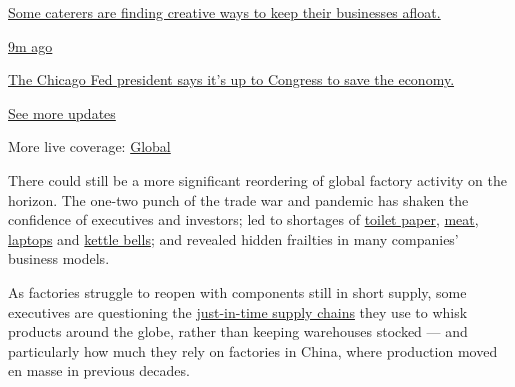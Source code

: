 \href{https://www.nytimes.com/live/2020/08/04/business/stock-market-today-coronavirus?action=click\&pgtype=Article\&state=default\&region=MAIN_CONTENT_1\&context=storylines_live_updates\#some-caterers-are-finding-creative-ways-to-keep-their-businesses-afloat}{Some
caterers are finding creative ways to keep their businesses afloat.}

\href{https://www.nytimes.com/live/2020/08/04/business/stock-market-today-coronavirus?action=click\&pgtype=Article\&state=default\&region=MAIN_CONTENT_1\&context=storylines_live_updates\#the-chicago-fed-president-says-its-up-to-congress-to-save-the-economy}{9m
ago}

\href{https://www.nytimes.com/live/2020/08/04/business/stock-market-today-coronavirus?action=click\&pgtype=Article\&state=default\&region=MAIN_CONTENT_1\&context=storylines_live_updates\#the-chicago-fed-president-says-its-up-to-congress-to-save-the-economy}{The
Chicago Fed president says it's up to Congress to save the economy.}

\href{https://www.nytimes.com/live/2020/08/04/business/stock-market-today-coronavirus?action=click\&pgtype=Article\&state=default\&region=MAIN_CONTENT_1\&context=storylines_live_updates}{See
more updates}

More live coverage:
\href{https://www.nytimes.com/2020/08/04/world/coronavirus-covid-19.html?action=click\&pgtype=Article\&state=default\&region=MAIN_CONTENT_1\&context=storylines_live_updates}{Global}

There could still be a more significant reordering of global factory
activity on the horizon. The one-two punch of the trade war and pandemic
has shaken the confidence of executives and investors; led to shortages
of
\href{https://www.nytimes.com/2020/03/13/business/toilet-paper-shortage.html}{toilet
paper},
\href{https://www.nytimes.com/2020/05/05/business/coronavirus-meat-shortages.html}{meat},
\href{https://www.wsj.com/articles/cios-face-shortages-of-tech-gear-as-coronavirus-forces-shipment-delays-11586338202}{laptops}
and
\href{https://www.gq.com/story/inside-the-great-kettlebell-shortage}{kettle
bells}; and revealed hidden frailties in many companies' business
models.

As factories struggle to reopen with components still in short supply,
some executives are questioning the
\href{https://www.nytimes.com/2020/03/05/business/coronavirus-globalism.html}{just-in-time
supply chains} they use to whisk products around the globe, rather than
keeping warehouses stocked --- and particularly how much they rely on
factories in China, where production moved en masse in previous decades.

